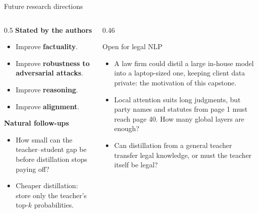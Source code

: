 \documentclass[aspectratio=169,11pt]{beamer}
\begin{document}
\begin{frame}{Future research directions}
  \begin{columns}[T]
    \begin{column}{0.5\textwidth}
      \small
      \textbf{Stated by the authors}
      \begin{itemize}
        \item Improve \textbf{factuality}.
        \item Improve \textbf{robustness to adversarial attacks}.
        \item Improve \textbf{reasoning}.
        \item Improve \textbf{alignment}.
      \end{itemize}
      \vspace{1mm}
      \textbf{Natural follow-ups}
      \begin{itemize}
        \item How small can the teacher--student gap be before distillation stops paying off?
        \item Cheaper distillation: store only the teacher's top-$k$ probabilities.
      \end{itemize}
    \end{column}
    \begin{column}{0.46\textwidth}
      \begin{block}{Open for legal NLP}
        \small
        \begin{itemize}
          \item A law firm could distil a large in-house model into a laptop-sized one, keeping client data private: the motivation of this capstone.
          \item Local attention suits long judgments, but party names and statutes from page 1 must reach page 40. How many global layers are enough?
          \item Can distillation from a general teacher transfer legal knowledge, or must the teacher itself be legal?
        \end{itemize}
      \end{block}
    \end{column}
  \end{columns}
\end{frame}
\end{document}
